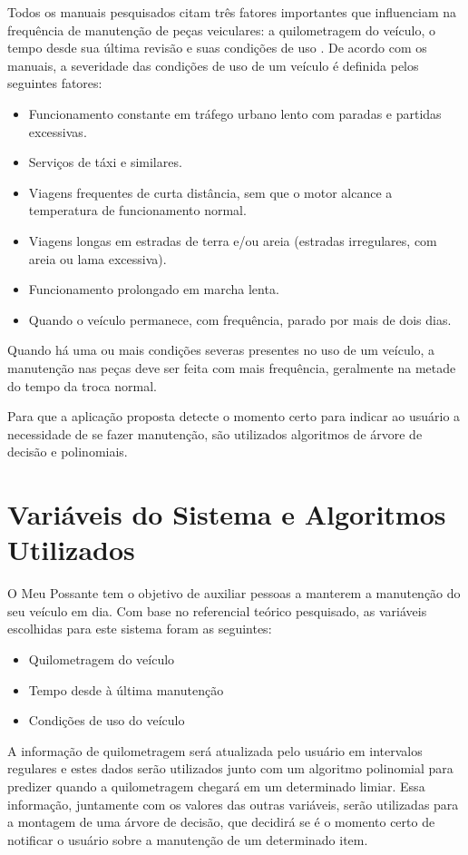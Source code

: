 \documentclass[12pt]{article}
\begin{document}
Todos os manuais pesquisados citam três fatores importantes que influenciam na
frequência de manutenção de peças veiculares: a quilometragem do veículo, o
tempo desde sua última revisão e suas condições de uso \cite{manualhyundai,
manualonix, manualka}. De acordo com os manuais, a severidade das condições de
uso de um veículo é definida pelos seguintes fatores:

\begin{itemize}
  \item Funcionamento constante em tráfego urbano lento com paradas e partidas
  excessivas.
  \item Serviços de táxi e similares.
  \item Viagens frequentes de curta distância, sem que o motor alcance a
  temperatura de funcionamento normal.
  \item Viagens longas em estradas de terra e/ou areia (estradas irregulares,
  com areia ou lama excessiva).
  \item Funcionamento prolongado em marcha lenta.
  \item Quando o veículo permanece, com frequência, parado por mais de dois
  dias.
\end{itemize}

Quando há uma ou mais condições severas presentes no uso de um veículo, a
manutenção nas peças deve ser feita com mais frequência, geralmente na metade do
tempo da troca normal.

Para que a aplicação proposta detecte o momento certo para indicar ao usuário a
necessidade de se fazer manutenção, são utilizados algoritmos de árvore de
decisão e polinomiais.

\section{Variáveis do Sistema e Algoritmos Utilizados} \label{sec:algoritmos}
O Meu Possante tem o objetivo de auxiliar pessoas a manterem a manutenção do seu
veículo em dia. Com base no referencial teórico pesquisado, as variáveis
escolhidas para este sistema foram as seguintes:

\begin{itemize}
    \item Quilometragem do veículo
    \item Tempo desde à última manutenção
    \item Condições de uso do veículo
\end{itemize}

A informação de quilometragem será atualizada pelo usuário em intervalos
regulares e estes dados serão utilizados junto com um algoritmo polinomial
para predizer quando a quilometragem chegará em um determinado limiar. Essa
informação, juntamente com os valores das outras variáveis, serão utilizadas
para a montagem de uma árvore de decisão, que decidirá se é o momento certo de
notificar o usuário sobre a manutenção de um determinado item.
\end{document}
